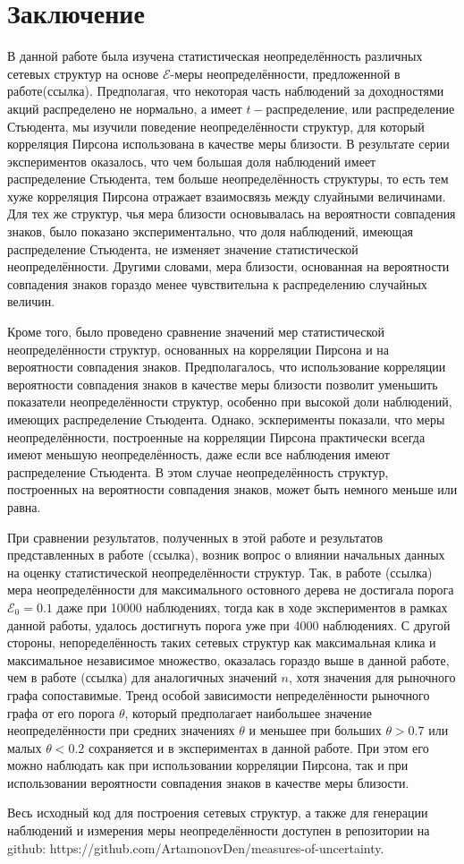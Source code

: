 \section{Заключение}

В данной работе была изучена статистическая неопределённость различных сетевых структур на основе $\mathcal{E}$-меры неопределённости, предложенной в работе(ссылка). Предполагая, что некоторая часть наблюдений за доходностями акций распределено не нормально, а имеет $t-$распределение, или распределение Стьюдента, мы изучили поведение неопределённости структур, для который корреляция Пирсона использована в качестве меры близости. В результате серии экспериментов оказалось, что чем большая доля наблюдений имеет распределение Стьюдента, тем больше неопределённость структуры, то есть тем хуже корреляция Пирсона отражает взаимосвязь между слуайными величинами. Для тех же структур, чья мера близости основывалась на вероятности совпадения знаков, было показано экспериментально, что доля наблюдений, имеющая распределение Стьюдента, не изменяет значение статистической неопределённости. Другими словами, мера близости, основанная на вероятности совпадения знаков гораздо менее чувствительна к распределению случайных величин.

Кроме того, было проведено сравнение значений мер статистической неопределённости структур, основанных на корреляции Пирсона и на вероятности совпадения знаков. Предполагалось, что использование корреляции вероятности совпадения знаков в качестве меры близости позволит уменьшить показатели неопределённости структур, особенно при высокой доли наблюдений, имеющих распределение Стьюдента. Однако, эскперименты показали, что меры неопределённости, построенные на корреляции Пирсона практически всегда имеют меньшую неопределённость, даже если все наблюдения имеют распределение Стьюдента. В этом случае неопределённость структур, построенных на вероятности совпадения знаков, может быть немного меньше или равна.

При сравнении результатов, полученных в этой работе и результатов представленных в работе (ссылка), возник вопрос о влиянии начальных данных на оценку статистической неопределённости структур. Так, в работе (ссылка) мера неопределённости для максимального остовного дерева не достигала порога $\mathcal{E}_0=0.1$ даже при 10000 наблюдениях, тогда как в ходе экспериментов в рамках данной работы, удалось достигнуть порога уже при 4000 наблюдениях.  С другой стороны, непоределённость таких сетевых структур как максимальная клика и максимальное независимое множество, оказалась гораздо выше  в данной работе, чем в работе (ссылка) для аналогичных значений $n$, хотя значения для рыночного графа сопоставимые. Тренд особой зависимости непределённости рыночного графа от его порога $\theta$, который предполагает наибольшее значение неопределённости при средних значениях $\theta$ и меньшее при больших $\theta>0.7$ или малых $\theta<0.2$ сохраняется и в экспериментах в данной работе. При этом его можно наблюдать как при использовании корреляции Пирсона, так и при использовании вероятности совпадения знаков в качестве меры близости.

Весь исходный код для построения сетевых структур, а также для генерации наблюдений и измерения меры неопределённости доступен в репозитории на github: https://github.com/ArtamonovDen/measures-of-uncertainty.